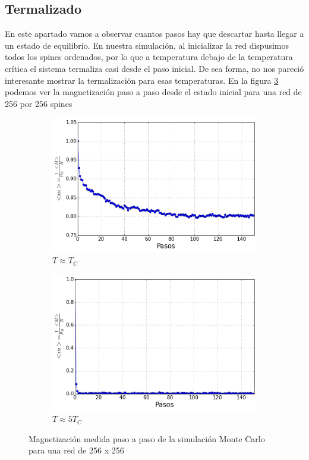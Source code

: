 \documentclass[12pt,a4paper]{article}
\begin{document}
\subsection{Termalizado}
En este apartado vamos a observar cuantos pasos hay que descartar hasta llegar a un estado de equilibrio. En nuestra simulación, al inicializar la red dispusimos todos los spines ordenados, por lo que a temperatura debajo de la temperatura crítica el sistema termaliza casi desde el paso inicial. De sea forma, no nos pareció interesante mostrar la termalización para esas temperaturas. En la figura \ref{fig:term_256} podemos ver la magnetización paso a paso desde el estado inicial para una red de 256 por 256 spines

\begin{figure}[H]
\begin{subfigure}[c]{0.45\textwidth}
\centering
\includegraphics[width=\textwidth]{termalizado/term_L_256_tc.png}
\caption{$T \approx T_C$}
\label{fig:term_256_tc}
\end{subfigure}
\begin{subfigure}[c]{0.45\textwidth}
\centering
\includegraphics[width=\textwidth]{termalizado/term_L_256_5tc.png}
\caption{$T \approx 5 T_C$}
\label{fig:term_256_5tc}
\end{subfigure}
\caption{Magnetización medida paso a paso de la simulación Monte Carlo para una red de 256 x 256}
\label{fig:term_256}
\end{figure}
\end{document}
